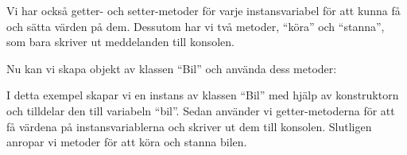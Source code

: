 Vi har också getter- och setter-metoder för varje instansvariabel för
att kunna få och sätta värden på dem. Dessutom har vi två metoder,
``köra'' och ``stanna'', som bara skriver ut meddelanden till konsolen.

Nu kan vi skapa objekt av klassen ``Bil'' och använda dess metoder:

\hypertarget{cb2}{}
\begin{Shaded}
\begin{Highlighting}[]
 \OperatorTok{\{}
   \OperatorTok{(}\OperatorTok{[]}\OperatorTok{)} \OperatorTok{\{}
\OperatorTok{=}  \OperatorTok{(}\OperatorTok{,} \OperatorTok{,} \OperatorTok{);}
\OperatorTok{(} \OperatorTok{+}\OperatorTok{());}
\OperatorTok{(} \OperatorTok{+}\OperatorTok{());}
\OperatorTok{(} \OperatorTok{+}\OperatorTok{());}
\OperatorTok{();}
\OperatorTok{();}
\OperatorTok{\}}
\OperatorTok{\}}
\end{Highlighting}
\end{Shaded}

I detta exempel skapar vi en instans av klassen ``Bil'' med hjälp av
konstruktorn och tilldelar den till variabeln ``bil''. Sedan använder vi
getter-metoderna för att få värdena på instansvariablerna och skriver ut
dem till konsolen. Slutligen anropar vi metoder för att köra och stanna
bilen.

